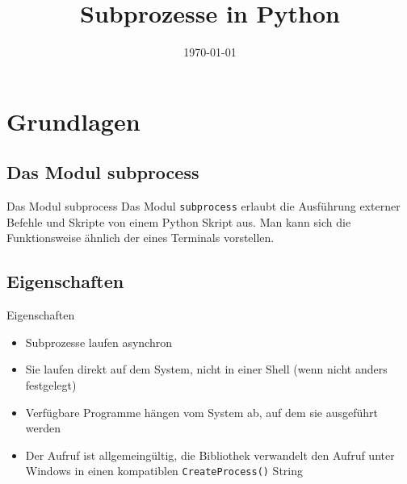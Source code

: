 


\newcommand{\topic}{
	Subprozesse in Python
}

\title{\topic}
\supertitle{\course}
\date{\today}



\maketitle

\begin{frame}
	\tableofcontents
\end{frame}


\section{Grundlagen}
\subsection{Das Modul subprocess}
\begin{frame}[fragile]{Das Modul subprocess}
	Das Modul \texttt{subprocess} erlaubt die Ausführung externer Befehle und
	Skripte von einem Python Skript aus. Man kann sich die Funktionsweise ähnlich
	der eines Terminals vorstellen.
\end{frame}


\subsection{Eigenschaften}
\begin{frame}[fragile]{Eigenschaften}
	\begin{itemize}
		\item Subprozesse laufen asynchron
		\item Sie laufen direkt auf dem System, nicht in einer Shell
		(wenn nicht anders festgelegt)
		\item Verfügbare Programme hängen vom System ab, auf dem sie ausgeführt werden
		\item Der Aufruf ist allgemeing\"ultig, die Bibliothek verwandelt den
		Aufruf unter Windows in einen kompatiblen \texttt{CreateProcess()} String
	\end{itemize}
\end{frame}


